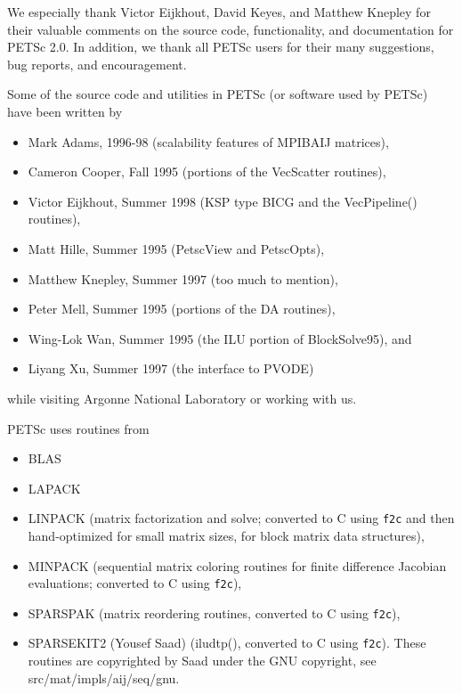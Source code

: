 %
%

\medskip \medskip \noindent
We especially thank Victor Eijkhout, David Keyes, and Matthew Knepley for their valuable 
comments on the 
source code, functionality, and documentation  for PETSc 2.0.  
In addition, we thank all PETSc users for
their many suggestions, bug reports, and encouragement.


\vspace{.3in}
\noindent
Some of the source code and utilities in PETSc (or software used by PETSc)
have been written by 
\begin{itemize}
  \item Mark Adams, 1996-98 (scalability features of MPIBAIJ matrices),
  \item Cameron Cooper, Fall 1995 (portions of the VecScatter routines), 
  \item Victor Eijkhout, Summer 1998 (KSP type BICG and the VecPipeline() routines), 
  \item Matt Hille, Summer 1995 (PetscView and PetscOpts), 
  \item Matthew Knepley, Summer 1997 (too much to mention),
  \item Peter Mell, Summer 1995 (portions of the DA routines),
  \item Wing-Lok Wan, Summer 1995 (the ILU portion of BlockSolve95), and
  \item Liyang Xu, Summer 1997 (the interface to PVODE)
\end{itemize}
while visiting Argonne National Laboratory or working with us.

\vspace{.3in}
\noindent
PETSc uses routines from 
\begin{itemize}
  \item BLAS
  \item LAPACK
  \item LINPACK      (matrix factorization and solve; converted to C using {\tt f2c} and then 
                      hand-optimized for small matrix sizes, for block matrix data structures),
  \item MINPACK      (sequential matrix coloring routines for finite difference Jacobian
                       evaluations; converted to C using {\tt f2c}),
  \item SPARSPAK     (matrix reordering routines, converted to C using {\tt f2c}),
  \item SPARSEKIT2 (Yousef Saad) (iludtp(), converted to C using {\tt f2c}). These routines 
                     are copyrighted by Saad under the GNU copyright, see src/mat/impls/aij/seq/gnu.
\end{itemize}


